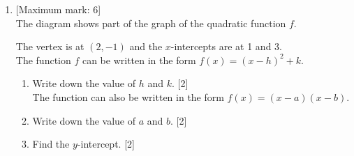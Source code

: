 \documentclass[12pt, twoside]{article}
\begin{document}
\begin{enumerate}[itemsep=0.5cm]
\newpage 
\item {[Maximum mark: 6]} \\[0.3cm]
    The diagram shows part of the graph of the quadratic function $f$. 
         \begin{center}
         \end{center}
         The vertex is at $(2, -1)$ and the $x$-intercepts are at 1 and 3.\\[0.25cm]
         The function $f$ can be written in the form $f(x)=(x-h)^2+k$.
         \begin{enumerate}%
             \item Write down the value of $h$ and $k$. \hfill [2]\\[0.25cm]
             The function can also be written in the form $f(x)=(x-a)(x-b)$.
             \item Write down the value of $a$ and $b$. \hfill [2]
             \item Find the $y$-intercept. \hfill [2]
         \end{enumerate}

\newpage

       
\end{enumerate}
\end{document}
